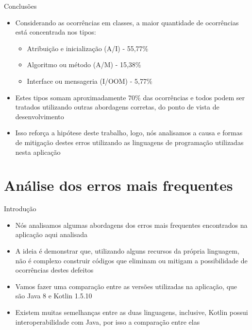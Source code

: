 \documentclass[brazilian]{beamer}
\begin{document}
\begin{frame}{Conclusões}
    \begin{itemize}
        \item Considerando as ocorrências em classes, a maior quantidade de ocorrências está concentrada nos tipos:
            \begin{itemize}
                \item Atribuição e inicialização (A/I) - 55,77\%
                \item Algoritmo ou método (A/M) - 15,38\%
                \item Interface ou mensageria (I/OOM) - 5,77\%
            \end{itemize}
        \item Estes tipos somam aproximadamente 70\% das ocorrências e todos podem ser tratados utilizando outras abordagens corretas, do ponto de vista de desenvolvimento
        \item Isso reforça a hipótese deste trabalho, logo, nós analisamos a causa e formas de mitigação destes erros utilizando as linguagens de programação utilizadas nesta aplicação
    \end{itemize}
\end{frame}

\section{Análise dos erros mais frequentes}

\begin{frame}{Introdução}
    \begin{itemize}
        \item Nós analisamos algumas abordagens dos erros mais frequentes encontrados na aplicação aqui analisada
        \item A ideia é demonstrar que, utilizando alguns recursos da própria linguagem, não é complexo construir códigos que eliminam ou mitigam a possibilidade de ocorrências destes defeitos
        \item Vamos fazer uma comparação entre as versões utilizadas na aplicação, que são Java 8 e Kotlin 1.5.10
        \item Existem muitas semelhanças entre as duas linguagens, inclusive, Kotlin possui interoperabilidade com Java, por isso a comparação entre elas
    \end{itemize}
\end{frame}
\end{document}
